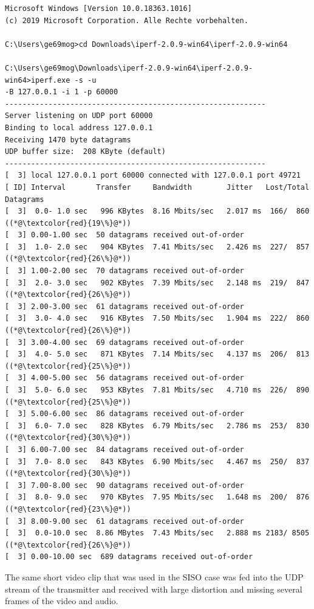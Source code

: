 \begin{lstlisting}[style=DOS]
Microsoft Windows [Version 10.0.18363.1016]
(c) 2019 Microsoft Corporation. Alle Rechte vorbehalten.

C:\Users\ge69mog>cd Downloads\iperf-2.0.9-win64\iperf-2.0.9-win64

C:\Users\ge69mog\Downloads\iperf-2.0.9-win64\iperf-2.0.9-win64>iperf.exe -s -u
-B 127.0.0.1 -i 1 -p 60000
------------------------------------------------------------
Server listening on UDP port 60000
Binding to local address 127.0.0.1
Receiving 1470 byte datagrams
UDP buffer size:  208 KByte (default)
------------------------------------------------------------
[  3] local 127.0.0.1 port 60000 connected with 127.0.0.1 port 49721
[ ID] Interval       Transfer     Bandwidth        Jitter   Lost/Total Datagrams
[  3]  0.0- 1.0 sec   996 KBytes  8.16 Mbits/sec   2.017 ms  166/  860 ((*@\textcolor{red}{19\%}@*))
[  3] 0.00-1.00 sec  50 datagrams received out-of-order
[  3]  1.0- 2.0 sec   904 KBytes  7.41 Mbits/sec   2.426 ms  227/  857 ((*@\textcolor{red}{26\%}@*))
[  3] 1.00-2.00 sec  70 datagrams received out-of-order
[  3]  2.0- 3.0 sec   902 KBytes  7.39 Mbits/sec   2.148 ms  219/  847 ((*@\textcolor{red}{26\%}@*))
[  3] 2.00-3.00 sec  61 datagrams received out-of-order
[  3]  3.0- 4.0 sec   916 KBytes  7.50 Mbits/sec   1.904 ms  222/  860 ((*@\textcolor{red}{26\%}@*))
[  3] 3.00-4.00 sec  69 datagrams received out-of-order
[  3]  4.0- 5.0 sec   871 KBytes  7.14 Mbits/sec   4.137 ms  206/  813 ((*@\textcolor{red}{25\%}@*))
[  3] 4.00-5.00 sec  56 datagrams received out-of-order
[  3]  5.0- 6.0 sec   953 KBytes  7.81 Mbits/sec   4.710 ms  226/  890 ((*@\textcolor{red}{25\%}@*))
[  3] 5.00-6.00 sec  86 datagrams received out-of-order
[  3]  6.0- 7.0 sec   828 KBytes  6.79 Mbits/sec   2.786 ms  253/  830 ((*@\textcolor{red}{30\%}@*))
[  3] 6.00-7.00 sec  84 datagrams received out-of-order
[  3]  7.0- 8.0 sec   843 KBytes  6.90 Mbits/sec   4.467 ms  250/  837 ((*@\textcolor{red}{30\%}@*))
[  3] 7.00-8.00 sec  90 datagrams received out-of-order
[  3]  8.0- 9.0 sec   970 KBytes  7.95 Mbits/sec   1.648 ms  200/  876 ((*@\textcolor{red}{23\%}@*))
[  3] 8.00-9.00 sec  61 datagrams received out-of-order
[  3]  0.0-10.0 sec  8.86 MBytes  7.43 Mbits/sec   2.888 ms 2183/ 8505 ((*@\textcolor{red}{26\%}@*))
[  3] 0.00-10.00 sec  689 datagrams received out-of-order

\end{lstlisting}

The same short video clip that was used in the SISO case was fed into the UDP stream of the transmitter and received with large distortion and missing several frames of the video and audio.

